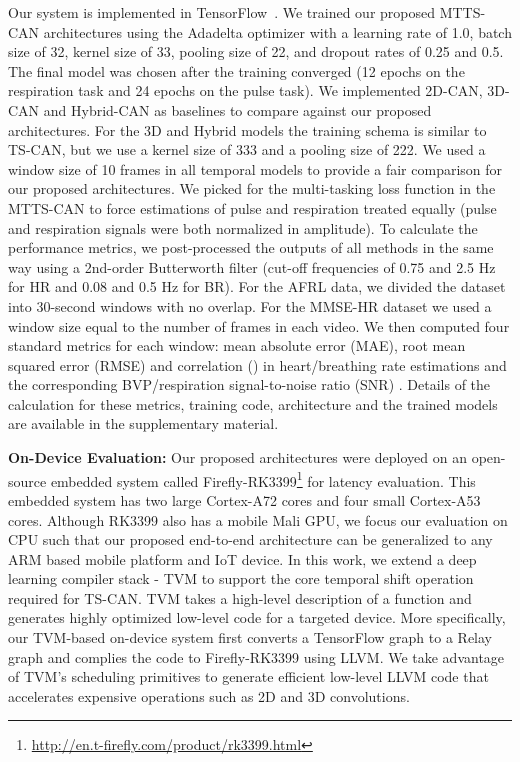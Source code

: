 \documentclass{article}
\begin{document}
Our system is implemented in TensorFlow~\citep{abadi2016tensorflow}. We trained our proposed MTTS-CAN architectures using the Adadelta optimizer \citep{zeiler2012adadelta} with a learning rate of 1.0, batch size of 32, kernel size of 33, pooling size of 22, and dropout rates of 0.25 and 0.5. The final model was chosen after the training converged (12 epochs on the respiration task and 24 epochs on the pulse task). We implemented 2D-CAN, 3D-CAN and Hybrid-CAN as baselines to compare against our proposed architectures. For the 3D and Hybrid models the training schema is similar to TS-CAN, but we use a kernel size of 333 and a pooling size of 222. We used a window size of 10 frames in all temporal models to provide a fair comparison for our proposed architectures. We picked  for the multi-tasking loss function in the MTTS-CAN to force estimations of pulse and respiration treated equally (pulse and respiration signals were both normalized in amplitude).  
To calculate the performance metrics, we post-processed the outputs of all methods in the same way using a 2nd-order Butterworth filter (cut-off frequencies of 0.75 and 2.5 Hz for HR and 0.08 and 0.5 Hz for BR). For the AFRL data, we divided the dataset into 30-second windows with no overlap. For the MMSE-HR dataset we used a window size equal to the number of frames in each video. We then computed four standard metrics for each window: mean absolute error (MAE), root mean squared error (RMSE) and correlation () in heart/breathing rate estimations and the corresponding BVP/respiration signal-to-noise ratio (SNR) \citep{de2013robust}. Details of the calculation for these metrics, training code, architecture and the trained models are available in the supplementary material. 

\textbf{On-Device Evaluation:} Our proposed architectures were deployed on an open-source embedded system called Firefly-RK3399\footnote{\url{http://en.t-firefly.com/product/rk3399.html}} for latency evaluation. This embedded system has two large Cortex-A72 cores and four small Cortex-A53 cores. Although RK3399 also has a mobile Mali GPU, we focus our evaluation on CPU such that our proposed end-to-end architecture can be generalized to any ARM based mobile platform and IoT device. In this work, we extend a deep learning compiler stack - TVM \citep{chen2018tvm} to support the core temporal shift operation required for TS-CAN. TVM takes a high-level description of a function and generates highly optimized low-level code for a targeted device. More specifically, our TVM-based on-device system first converts a TensorFlow graph to a Relay graph \citep{roesch2018relay} and complies the code to Firefly-RK3399 using LLVM. We take advantage of TVM’s scheduling primitives to generate efficient low-level LLVM code that accelerates expensive operations such as 2D and 3D convolutions.
\end{document}
